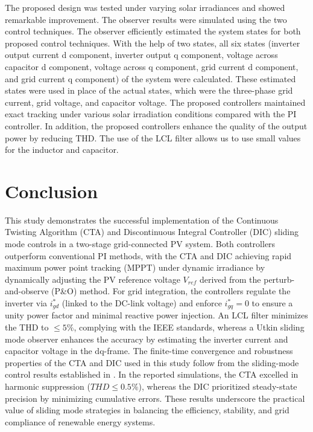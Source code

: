 \documentclass[preprint,12pt]{elsarticle}
\begin{document}
The proposed design was tested under varying solar irradiances and showed remarkable improvement. The observer results were simulated using the two control techniques. The observer efficiently estimated the system states for both proposed control techniques. With the help of two states, all six states (inverter output current d component, inverter output q component, voltage across capacitor d component, voltage across q component, grid current d component, and grid current q component) of the system were calculated. These estimated states were used in place of the actual states, which were the three-phase grid current, grid voltage, and capacitor voltage. The proposed controllers maintained exact tracking under various solar irradiation conditions compared with the PI controller. In addition, the proposed controllers enhance the quality of the output power by reducing THD. The use of the LCL filter allows us to use small values for the inductor and capacitor.
\section{Conclusion}
\label{sec:conclusion}
This study demonstrates the successful implementation of the Continuous Twisting Algorithm (CTA) and Discontinuous Integral Controller (DIC) sliding mode controls in a two-stage grid-connected PV system. Both controllers outperform conventional PI methods, with the CTA and DIC achieving rapid maximum power point tracking (MPPT) under dynamic irradiance by dynamically adjusting the PV reference voltage \(V_{ref}\) derived from the perturb-and-observe (P\&O) method. For grid integration, the controllers regulate the inverter via \(i^*_{gd}\) (linked to the DC-link voltage) and enforce \(i^*_{gq}=0\) to ensure a unity power factor and minimal reactive power injection. An LCL filter minimizes the THD to $\leq 5\%$, complying with the IEEE standards, whereas a Utkin sliding mode observer enhances the accuracy by estimating the inverter current and capacitor voltage in the dq-frame. The finite-time convergence and robustness properties of the CTA and DIC used in this study follow from the sliding-mode control results established in \cite{torres2017design, moreno2017discontinuous}. In the reported simulations, the CTA excelled in harmonic suppression ($THD \leq 0.5\%$), whereas the DIC prioritized steady-state precision by minimizing cumulative errors. These results underscore the practical value of sliding mode strategies in balancing the efficiency, stability, and grid compliance of renewable energy systems.
\end{document}
